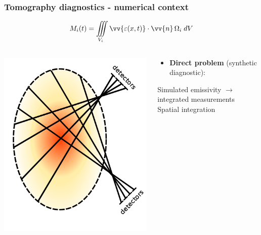 \documentclass[10pt]{beamer}
\begin{document}
\begin{frame}
\frametitle{Tomography diagnostics - numerical context}

    $$M_i(t) = \iiint\limits_{V_i} \vv{\varepsilon(x,t)}\cdot\vv{n} \,\Omega_i \;{d}V$$
    \vspace{-0.75cm}
\begin{columns}
    	\begin{column}{0.325\textwidth}
    	
    	\includegraphics[width=\linewidth]{figures/detectors2.png}

    	\end{column}

   	\begin{column}{0.675\textwidth}
   	\begin{center}
   	
   	\begin{block}{}
	\begin{itemize}
	\item \textcolor{myblue}{\textbf{Direct problem} (synthetic diagnostic):\\
	}
	\end{itemize}
	\end{block}
Simulated emissivity $\longrightarrow$ integrated measurements\\
	\textcolor{SchoolColor}{Spatial integration}\\


\end{center}
\end{column}
\end{columns}
\end{frame}
\end{document}
